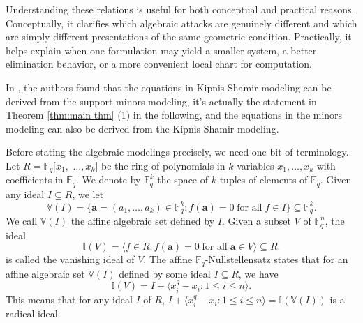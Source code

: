 \documentclass[a4paper, 11pt]{amsart}
\newcommand{\mb}[1]{\mathbb{#1}}
\newcommand{\ideala}[1]{\langle{#1}\rangle}
\newcommand{\td}[1]{\bm{#1}}
\newcommand{\tx}[1]{\text{#1}}
\newcommand{\fq}{\mathbb{F}_q}
\theoremstyle{definition}
\theoremstyle{definition}
\begin{document}
	Understanding these relations is useful for both conceptual and practical reasons. Conceptually, it clarifies which algebraic attacks are genuinely different and which are simply different presentations of the same geometric condition. Practically, it helps explain when one formulation may yield a smaller system, a better elimination behavior, or a more convenient local chart for computation.
	
	In \cite{guo2022algebraic,GSM}, the authors found that the equations in Kipnis-Shamir modeling can be derived from the support minors modeling, it's actually the statement in Theorem \ref{thm:main thm} (1) in the following,
	and the equations in the minors modeling can also be derived from the Kipnis-Shamir modeling.
	
	Before stating the algebraic modelings precisely, we need one bit of terminology. Let $R=\fq[x_1,$ $\dots,x_k]$ be the ring of polynomials in $k$ variables $x_1,\dots,x_k$ with coefficients in $\fq$. We denote by $\fq^k$ the space of $k$-tuples of elements of $\fq$. Given any ideal $I\subseteq R$, we let
	\begin{equation*}
		\mb{V}(I)=\{\td{a}=(a_1,\dots,a_k)\in\fq^k:f(\td{a})=0\;\tx{for all}\;f\in I\}\subseteq\fq^k.
	\end{equation*}
	We call $\mb{V}(I)$ the affine algebraic set defined by $I$. Given a subset $V$ of $\fq^n$, the ideal
	\begin{equation*}
		\mb{I}(V)=\ideala{f\in R:f(\td{a})=0\;\tx{for all}\;\td{a}\in V}\subseteq R.
	\end{equation*}
	is called the vanishing ideal of $V$. The affine $\fq$-Nullstellensatz \cite[Theorem 2.3]{Null} states that for an affine algebraic set $\mb{V}(I)$ defined by some ideal $I\subseteq R$, we have
	\begin{equation*}
		\mb{I}(V)=I+\ideala{x_i^q-x_i:1\leq i\leq n}.
	\end{equation*}
	This means that for any ideal $I$ of $R$, $I+\ideala{x_i^q-x_i:1\leq i\leq n}=\mb{I}(\mb{V}(I))$ is a radical ideal. 
	
\end{document}

